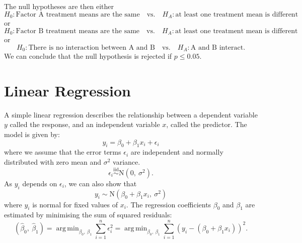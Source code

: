\documentclass{article}
\DeclareMathOperator*{\argmin}{arg\,min}
\begin{document}
The null hypotheses are then either
\begin{equation*}
    H_0 : \text{Factor A treatment means are the same} \quad \text{vs.} \quad H_A : \text{at least one treatment mean is different}
\end{equation*}
or
\begin{equation*}
    H_0 : \text{Factor B treatment means are the same} \quad \text{vs.} \quad H_A : \text{at least one treatment mean is different}
\end{equation*}
or
\begin{equation*}
    H_0 : \text{There is no interaction between A and B} \quad \text{vs.} \quad H_A : \text{A and B interact}.
\end{equation*}
We can conclude that the null hypothesis is rejected if \(p \leq 0.05\).
\section{Linear Regression}
A simple linear regression describes the relationship between a
dependent variable \(y\) called the response, and an independent
variable \(x\), called the predictor. The model is given by:
\begin{equation*}
    y_i = \beta_0 + \beta_1 x_i + \epsilon_i
\end{equation*}
where we assume that the error terms \(\epsilon_i\) are independent and normally distributed with zero mean and \(\sigma^2\) variance.
\begin{equation*}
    \epsilon_i \overset{\mathrm{iid}}{\sim} \mathrm{N}\left( 0,\: \sigma^2 \right).
\end{equation*}
As \(y_i\) depends on \(\epsilon_i\), we can also show that
\begin{equation*}
    y_i \sim \mathrm{N}\left( \beta_0 + \beta_1 x_i,\: \sigma^2 \right)
\end{equation*}
where \(y_i\) is normal for fixed values of \(x_i\).
The regression coefficients \(\beta_0\) and \(\beta_1\) are estimated by minimising the sum of squared residuals:
\begin{equation*}
    \left( \hat{\beta}_0,\: \hat{\beta}_1 \right) = \argmin_{\beta_0,\: \beta_1} \sum_{i = 1}^n \epsilon_i^2 = \argmin_{\beta_0,\: \beta_1} \sum_{i = 1}^n \left( y_i - \left( \beta_0 + \beta_1 x_i \right) \right)^2.
\end{equation*}
\end{document}
